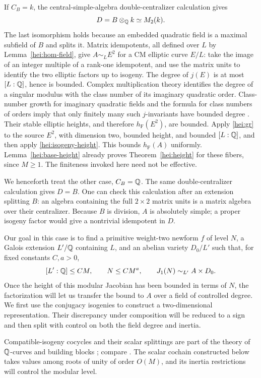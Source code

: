 If $C_B=k$, the central-simple-algebra double-centralizer calculation
gives
\[
                         D=B\otimes_\mathbb Q k\simeq M_2(k).
\]
The last isomorphism holds because an embedded quadratic field is a
maximal subfield of $B$ and splits it.  Matrix idempotents, all defined
over $L$ by Lemma~\ref{hei:hom-field}, give
$A\sim_L E^2$ for a CM elliptic curve $E/L$: take the image of an
integer multiple of a rank-one idempotent, and use the matrix units
to identify the two elliptic factors up to isogeny.  The degree of
$j(E)$ is at most $[L:\mathbb Q]$, hence is bounded.  Complex multiplication
theory identifies the degree of a singular modulus with the class
number of its imaginary quadratic order.  Class-number growth for
imaginary quadratic fields and the formula for class numbers of
orders imply that only finitely many such $j$-invariants have bounded
degree \cite{Cox2013,Siegel1935}.  Their stable elliptic heights, and
therefore $h_{\mathrm F}(E^2)$, are bounded.  Apply \eqref{hei:gr} to
the source $E^2$, with dimension two, bounded height, and bounded
$[L:\mathbb Q]$, and then apply \eqref{hei:isogeny-height}.  This bounds
$h_{\mathrm F}(A)$ uniformly.  Lemma~\ref{hei:base-height} already
proves Theorem~\ref{hei:height} for these fibers, since $M\ge1$.
The finiteness invoked here need not be effective.

We henceforth treat the other case, $C_B=\mathbb Q$.  The same
double-centralizer calculation gives $D=B$.  One can check this
calculation after an extension splitting $B$: an algebra containing
the full $2\times2$ matrix units is a matrix algebra over their
centralizer.  Because $B$ is division, $A$ is absolutely simple; a
proper isogeny factor would give a nontrivial idempotent in $D$.

Our goal in this case is to find a primitive weight-two newform $f$
of level $N$, a Galois extension $L'/\mathbb Q$ containing $L$, and an
abelian variety $D_0/L'$ such that, for fixed constants $C,a>0$,
\[
 [L':\mathbb Q]\le CM,\qquad N\le CM^a,\qquad
                    J_1(N)\sim_{L'}A\times D_0.
\]
Once the height of this modular Jacobian has been bounded in terms
of $N$, the factorization will let us transfer the bound to $A$ over
a field of controlled degree.  We first use the conjugacy isogenies
to construct a two-dimensional representation.  Their discrepancy
under composition will be reduced to a sign and then split with
control on both the field degree and inertia.

Compatible-isogeny cocycles and their scalar splittings are part of
the theory of $\mathbb Q$-curves and building blocks
\cite[Section~6]{Ribet1992}\cite[Chapters~4--5]{Pyle1995};
compare \cite[Section~4]{Quer2001Fields}.
The scalar cochain constructed below takes values among roots of unity
of order $O(M)$, and its inertia restrictions will control the modular level.

